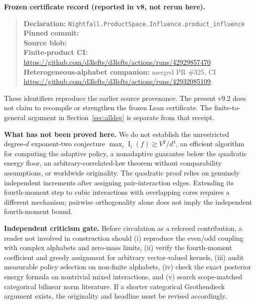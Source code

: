 \documentclass[11pt,letterpaper]{article}
\theoremstyle{definition}\newtheorem{definition}[theorem]{Definition}
\newcommand{\Inf}{\operatorname{I}}
\begin{document}
\noindent\textbf{Frozen certificate record (reported in v8, not rerun here).}
\begin{quote}\small\raggedright
\textbf{Declaration:} \texttt{Nightfall.ProductSpace.Influence.product\_influence}\\
\textbf{Pinned commit:} \texttt{}\\
\textbf{Source blob:} \texttt{}\\
\textbf{Finite-product CI:} \url{https://github.com/d3lefts/d3lefts/actions/runs/42929857470}\\
\textbf{Heterogeneous-alphabet companion:} merged PR \#325, CI
\url{https://github.com/d3lefts/d3lefts/actions/runs/42932085109}.
\end{quote}
These identifiers reproduce the earlier source provenance. The present v9.2 does not claim to recompile or strengthen the frozen Lean certificate. The finite-to-general argument in Section~\ref{sec:alldeg} is separate from that receipt.\par\medskip

\noindent\textbf{What has not been proved here.} We do not establish the unrestricted degree-$d$ exponent-two conjecture $\max_i\Inf_i(f)\gtrsim V^2/d^4$, an efficient algorithm for computing the adaptive policy, a nonadaptive guarantee below the quadratic energy floor, an arbitrary-correlated-law theorem without comparability assumptions, or worldwide originality. The quadratic proof relies on genuinely independent increments after assigning pair-interaction edges. Extending its fourth-moment step to cubic interactions with overlapping cores requires a different mechanism; pairwise orthogonality alone does not imply the independent fourth-moment bound.

\noindent\textbf{Independent criticism gate.} Before circulation as a refereed contribution, a reader not involved in construction should (i) reproduce the even/odd coupling with complex alphabets and zero-mass limits, (ii) verify the fourth-moment coefficient and greedy assignment for arbitrary vector-valued kernels, (iii) audit measurable policy selection on non-finite alphabets, (iv) check the exact posterior energy formula on nontrivial mixed interactions, and (v) search scope-matched categorical bilinear norm literature. If a shorter categorical Grothendieck argument exists, the originality and headline must be revised accordingly.
\end{document}
